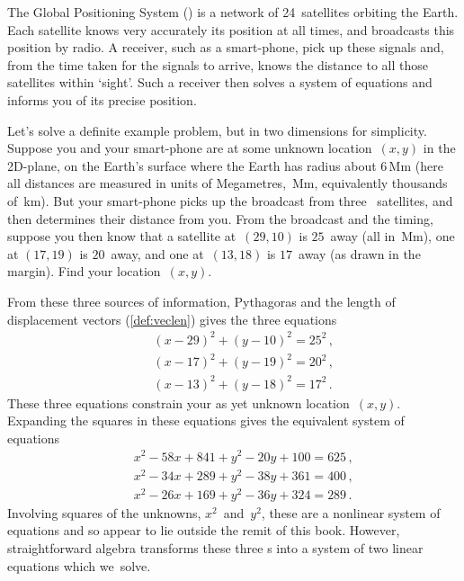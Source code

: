 \begin{example} \label{eg:gps2}
The Global Positioning System (\gps) is a network of 24~satellites orbiting the Earth.
Each satellite knows very accurately its position at all times, and broadcasts this position by radio.
A receiver, such as a smart-phone, pick up these signals and, from the time taken for the signals to arrive, knows the distance to all those satellites within `sight'.
Such a receiver then solves a system of equations and informs you of its precise position.

Let's solve a definite example problem, but in two dimensions for simplicity.
Suppose you and your smart-phone are at some unknown location~\((x,y)\) in the 2D-plane, on the Earth's surface where the Earth has radius about \(6\)\,Mm (here all distances are measured in units of Megametres,~Mm, equivalently thousands of~km).
But your smart-phone picks up the broadcast from three \gps\ satellites, and then determines their distance from you.
%
From the broadcast and the timing, suppose you then know that a satellite at~\((29,10)\) is \(25\)~away (all in~Mm), one at \((17,19)\) is \(20\)~away, and one at~\((13,18)\) is \(17\)~away (as drawn in the margin).
Find your location~\((x,y)\).


\begin{solution} 
From these three sources of information, Pythagoras and the length of displacement vectors (\autoref{def:veclen}) gives the three equations
\begin{eqnarray*}
&&(x-29)^2+(y-10)^2=25^2\,,
\\&&(x-17)^2+(y-19)^2=20^2\,,
\\&&(x-13)^2+(y-18)^2=17^2\,.
\end{eqnarray*}
These three equations constrain your as yet unknown location~\((x,y)\).
Expanding the squares in these equations gives the equivalent system of equations
\begin{eqnarray*}
&&x^2-58x+841+y^2-20y+100=625\,,
\\&&x^2-34x+289+y^2-38y+361=400\,,
\\&&x^2-26x+169+y^2-36y+324=289\,.
\end{eqnarray*}
Involving squares of the unknowns, \(x^2\)~and~\(y^2\), these are a nonlinear system of equations and so appear to lie outside the remit of this book.  
However, straightforward algebra transforms these three s into a system of two linear equations which we~solve.


\end{solution}
\end{example}
